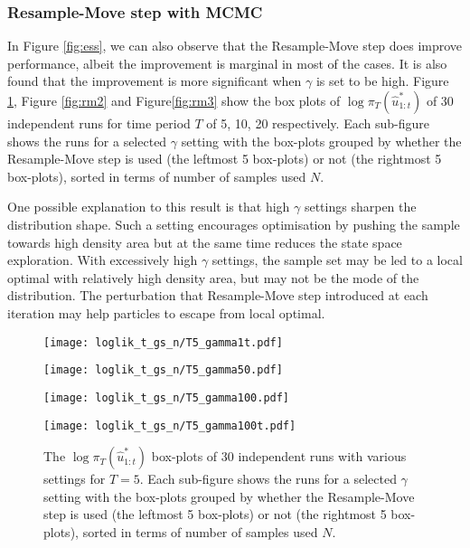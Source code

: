 \subsubsection{Resample-Move step with MCMC}
In Figure \ref{fig:ess}, we can also observe that the Resample-Move step does improve performance, albeit the improvement is marginal  in most of the cases. It is also found that the improvement is more significant when $\gamma$ is set to be high. Figure \ref{fig:rm1}, Figure \ref{fig:rm2} and Figure\ref{fig:rm3} show the box plots of $\log\pi_T(\hat{u}^*_{1:t})$ of $30$ independent runs for time period $T$ of 5, 10, 20 respectively. Each sub-figure shows the runs for a selected $\gamma$ setting with the box-plots grouped by whether the Resample-Move step is used (the leftmost 5 box-plots) or not (the rightmost 5 box-plots), sorted in terms of number of samples used $N$.

One possible explanation to this result is that high $\gamma$ settings sharpen the distribution shape. Such a setting encourages optimisation by pushing the sample towards  high density area but at the same time reduces the state space exploration. With excessively high $\gamma$ settings, the sample set may be led to a local optimal with relatively high density area, but may not be the mode of the distribution. The perturbation that Resample-Move step introduced at each iteration may help particles to escape from local optimal.

\begin{figure}[!thbp]
    \centering
    \begin{minipage}{.5\textwidth}
        \centering
        \texttt{[image: loglik\_t\_gs\_n/T5\_gamma1t.pdf]}
    \end{minipage}%
    \begin{minipage}{0.5\textwidth}
        \centering
        \texttt{[image: loglik\_t\_gs\_n/T5\_gamma50.pdf]}
    \end{minipage}
    \begin{minipage}{0.5\textwidth}
        \centering
        \texttt{[image: loglik\_t\_gs\_n/T5\_gamma100.pdf]}
    \end{minipage}%
    \begin{minipage}{0.5\textwidth}
        \centering
        \texttt{[image: loglik\_t\_gs\_n/T5\_gamma100t.pdf]}
    \end{minipage}
    \caption{The $\log\pi_T(\hat{u}^*_{1:t})$ box-plots of 30 independent runs with various settings for $T=5$. Each sub-figure shows the runs for a selected $\gamma$ setting with the box-plots grouped by whether the Resample-Move step is used (the leftmost 5 box-plots) or not (the rightmost 5 box-plots), sorted in terms of number of samples used $N$.}
    \label{fig:rm1}
\end{figure}

